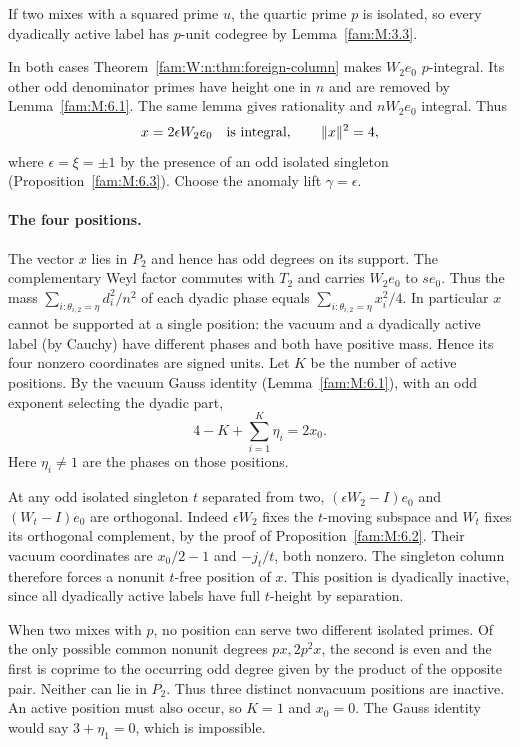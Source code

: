 \documentclass[11pt,a4paper]{article}
\numberwithin{equation}{section}
\theoremstyle{remark}
\begin{document}
If two mixes with a squared prime $u$, the quartic prime $p$ is
isolated, so every dyadically active label has $p$-unit codegree
by Lemma~\ref{fam:M:3.3}.

In both cases Theorem~\ref{fam:W:n:thm:foreign-column} makes $W_2e_0$
$p$-integral. Its other odd denominator primes have height one in $n$
and are removed by Lemma~\ref{fam:M:6.1}. The same lemma gives
rationality and $nW_2e_0$ integral. Thus
\[
                     x=2\epsilon W_2e_0\quad\hbox{is integral},
                     \qquad \|x\|^2=4 ,
\]
where $\epsilon=\xi=\pm1$ by the presence of an odd isolated
singleton (Proposition~\ref{fam:M:6.3}). Choose the anomaly lift
$\gamma=\epsilon$.

\paragraph{The four positions.}
The vector $x$ lies in $P_2$ and hence has odd degrees on its
support. The complementary Weyl factor commutes with $T_2$
and carries $W_2e_0$ to $se_0$. Thus the mass
$\sum_{i:\theta_{i,2}=\eta}d_i^2/n^2$ of each dyadic phase equals
$\sum_{i:\theta_{i,2}=\eta}x_i^2/4$. In particular $x$ cannot
be supported at a single position: the vacuum and a dyadically
active label (by Cauchy) have different phases and both have positive
mass. Hence its four nonzero coordinates are signed units.
Let $K$ be the number of active positions. By the vacuum Gauss
identity (Lemma~\ref{fam:M:6.1}), with an odd exponent selecting the
dyadic part,
\[
                   4-K+\sum_{i=1}^K \eta_i=2x_0 .
\]
Here $\eta_i\ne1$ are the phases on those positions.

At any odd isolated singleton $t$ separated from two,
$(\epsilon W_2-I)e_0$ and $(W_t-I)e_0$ are orthogonal. Indeed
$\epsilon W_2$ fixes the $t$-moving subspace and $W_t$ fixes its
orthogonal complement, by the proof of Proposition~\ref{fam:M:6.2}.
Their vacuum coordinates are $x_0/2-1$ and $-j_t/t$, both nonzero.
The singleton column therefore forces a nonunit $t$-free position of
$x$. This position is dyadically inactive, since all dyadically
active labels have full $t$-height by separation.

When two mixes with $p$, no position can serve two different isolated
primes. Of the only possible common nonunit degrees $px,2p^2x$, the
second is even and the first is coprime to the occurring odd degree
given by the product of the opposite pair. Neither can lie in $P_2$.
Thus three distinct nonvacuum positions are inactive. An active
position must also occur, so $K=1$ and $x_0=0$. The Gauss identity
would say $3+\eta_1=0$, which is impossible.
\end{document}
